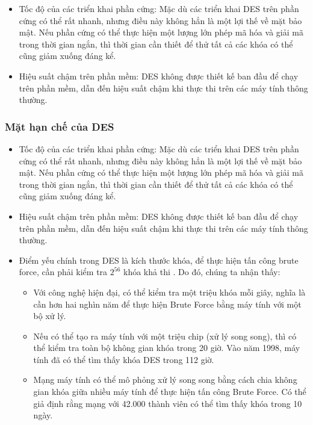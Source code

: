 \begin{enumerate}
\begin{itemize}
\begin{itemize}
        \item Tốc độ của các triển khai phần cứng: Mặc dù các triển khai DES trên phần cứng có thể rất nhanh, nhưng điều này không hẳn là một lợi thế về mặt bảo mật. Nếu phần cứng có thể thực hiện một lượng lớn phép mã hóa và giải mã trong thời gian ngắn, thì thời gian cần thiết để thử tất cả các khóa có thể cũng giảm xuống đáng kể.
        \item Hiệu suất chậm trên phần mềm: DES không được thiết kế ban đầu để chạy trên phần mềm, dẫn đến hiệu suất chậm khi thực thi trên các máy tính thông thường. 
    \end{itemize}
\end{itemize}
\end{enumerate}
\subsubsection{ Mặt hạn chế của DES}
\begin{itemize}
    \item Tốc độ của các triển khai phần cứng: Mặc dù các triển khai DES trên phần cứng có thể rất nhanh, nhưng điều này không hẳn là một lợi thế về mặt bảo mật. Nếu phần cứng có thể thực hiện một lượng lớn phép mã hóa và giải mã trong thời gian ngắn, thì thời gian cần thiết để thử tất cả các khóa có thể cũng giảm xuống đáng kể.
    \item Hiệu suất chậm trên phần mềm: DES không được thiết kế ban đầu để chạy trên phần mềm, dẫn đến hiệu suất chậm khi thực thi trên các máy tính thông thường. 
    \item Điểm yếu chính trong DES là kích thước khóa, để thực hiện tấn công brute force, cần phải kiểm tra $2^{56}$ khóa khả thi \cite{Wikipedia}. Do đó, chúng ta nhận thấy:
 \begin{itemize}
     \item Với công nghệ hiện đại, có thể kiểm tra một triệu khóa mỗi giây, nghĩa là cần hơn hai nghìn năm để thực hiện Brute Force bằng máy tính với một bộ xử lý.
    \item Nếu có thể tạo ra máy tính với một triệu chip (xử lý song song), thì có thể kiểm tra toàn bộ không gian khóa trong 20 giờ. Vào năm 1998, máy tính đã có thể tìm thấy khóa DES trong 112 giờ.
   \item Mạng máy tính có thể mô phỏng xử lý song song bằng cách chia không gian khóa giữa nhiều máy tính để thực hiện tấn công Brute Force. Có thể giả định rằng mạng với 42.000 thành viên có thể tìm thấy khóa trong 10 ngày.

\end{itemize}
    
\end{itemize}
